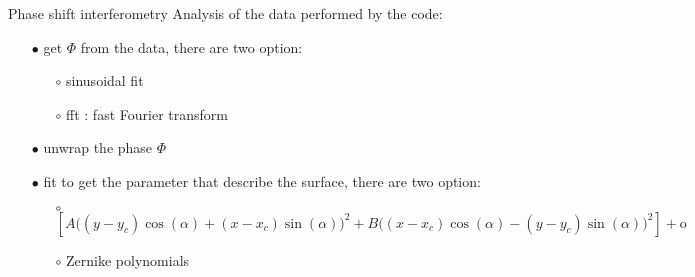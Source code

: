 \documentclass[handout]{beamer}
\theoremstyle{plain}
\theoremstyle{remark}
\theoremstyle{definition}
\begin{document}
  \begin{frame}{Phase shift interferometry}
    Analysis of the data performed by the code:

    \begin{itemize}
      \item[$\bullet$] get $\Phi$ from the data, there are two option:
      \begin{itemize}
        \item[$\circ$] sinusoidal fit
        \item[$\circ$] fft : fast Fourier transform
      \end{itemize}
      
      \item[$\bullet$] unwrap the phase $\Phi$

      \item[$\bullet$] fit to get the parameter that describe the surface, there are two option:
      \begin{itemize}
        \item[$\circ$] {\tiny $\left[A \Big((y-y_c) \cos(\alpha) +(x-x_c) \sin(\alpha)\Big)^2 + B\Big((x-x_c)  \cos(\alpha) - (y-y_c)\sin(\alpha)\Big)^2\right] + \text{{o}} $ }
        \item[$\circ$] Zernike polynomials
      \end{itemize}
    \end{itemize}
    
  \end{frame}
\end{document}
